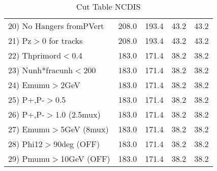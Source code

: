 \begin{table}[h!]
\begin{tabular}{||l||r|r|r|r||}
 20) No Hangers fromPVert &       208.0 &       193.4 &        43.2 &        43.2 \\
 21) Pz$>$0 for tracks    &       208.0 &       193.4 &        43.2 &        43.2 \\
 22) Thprimord$<$0.4      &       183.0 &       171.4 &        38.2 &        38.2 \\
 23) Nunh*fracunh$<$200   &       183.0 &       171.4 &        38.2 &        38.2 \\
 24) Emumu$>$2GeV         &       183.0 &       171.4 &        38.2 &        38.2 \\
 25) P+,P-$>$0.5          &       183.0 &       171.4 &        38.2 &        38.2 \\
 26) P+,P-$>$1.0 (2.5mux) &       183.0 &       171.4 &        38.2 &        38.2 \\
 27) Emumu$>$5GeV  (8mux) &       183.0 &       171.4 &        38.2 &        38.2 \\
 28) Phi12$>$90deg  (OFF) &       183.0 &       171.4 &        38.2 &        38.2 \\
 29) Pmumu$>$10GeV  (OFF) &       183.0 &       171.4 &        38.2 &        38.2 \\
 \hline
 \hline
 \end{tabular}
 \caption{Cut Table  NCDIS  }
 \label{tab-cut_ncdis}
 \end{table}

